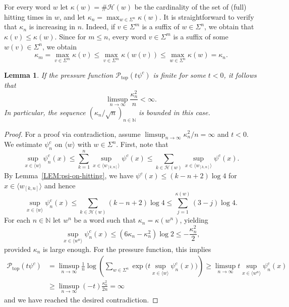 \documentclass[11pt,reqno]{amsart}
\theoremstyle{plain}
\newtheorem{lemma}[theorem]{Lemma}
\theoremstyle{definition}
\newcommand{\N}{{\mathbb N}}
\newcommand{\mc}{\mathcal}
\begin{document}
For every word $w$ let $\kappa(w) = \# \mc H(w)$ be the cardinality of the set of (full) hitting times in $w$,
and let $\kappa_n = \max_{w \in \Sigma^n} \kappa(w)$. It is straightforward to verify that $\kappa_n$ is increasing in $n$. Indeed, if $v \in \Sigma^m$ is a suffix of $w \in \Sigma^n$, we obtain that $\kappa(v) \leqslant \kappa(w)$. Since for $m\leqslant n$, every word $v \in \Sigma^m$ is a suffix of some $w(v) \in \Sigma^n$, we obtain
\[
\kappa_m = \max_{v \in \Sigma^m} \kappa(v) 
\leqslant \max_{v \in \Sigma^m} \kappa(w(v))
\leqslant \max_{w \in \Sigma^n} \kappa(w) = \kappa_n.
\]



\begin{lemma}
\label{LEM:fn-bound}
If the pressure function $\mc P_{\operatorname{\operatorname{top}}}(t \psi^c)$ is finite for some $t<0$, it follows that
\[
\limsup_{n \to \infty} \frac{\kappa_n^2}{n} < \infty.
\]
In particular, the sequence $(\kappa_n/\sqrt{n})_{n \in \N}$ is bounded in this case.
\end{lemma}


\begin{proof}
For a proof via contradiction, assume $\limsup_{n \to \infty} \kappa_n^2/n = \infty$ and $t < 0$. We estimate $\psi^c_n$ on $\langle w \rangle$ with $w \in \Sigma^n$. First, note that
\[
\sup_{x \in \langle w \rangle}  \psi^c_n(x) 
\leqslant \sum_{k=1}^n \sup_{x \in  \langle w_{[k,n]}\rangle} \psi^c(x)
\leqslant \sum_{k \in \mc H(w)} \sup_{x \in  \langle w_{[k,n]}\rangle} \psi^c(x).
\]
By Lemma~\ref{LEM:psi-on-hitting}, we have
$\psi^c(x) \leqslant (k-n+2) \log 4$ for $x\in\langle w_{[k,n]}\rangle$ and hence \[
\sup_{x \in \langle w \rangle} \psi^c_n(x) 
\leqslant  \sum_{k \in \mc H(w)} (k-n+2)\log 4
\leqslant  \sum_{j =1}^{\kappa(w)} (3-j)\log 4.
\]
For each $n \in \N$ let $w^n$ be a word such that $\kappa_n = \kappa(w^n)$, yielding
\[
\sup_{x \in \langle w^n\rangle} \psi^c_n(x) 
\leqslant  (6 \kappa_n - \kappa_n^2)\log 2 
\leqslant - \frac{\kappa_n^2}{2},
\]
provided $\kappa_n$ is large enough. For the pressure function, this implies
\begin{align*}
\mc P_{\operatorname{top}}(t \psi^c)
& = \limsup_{n\to \infty} \frac{1}{n} \log \left( \sum_{w \in \Sigma^n} \exp\biggl(t \sup_{x \in \langle w \rangle} \psi_n^{c}(x) \biggr) \right)
\geqslant \limsup_{n \to \infty} t \sup_{x \in \langle w^n\rangle} \psi_n^{c}(x)
\\ &\geqslant \limsup_{n \to \infty} (-t) \frac{\kappa_n^2}{2n} = \infty
\end{align*}
and we have reached the desired contradiction.
\end{proof}
\end{document}
